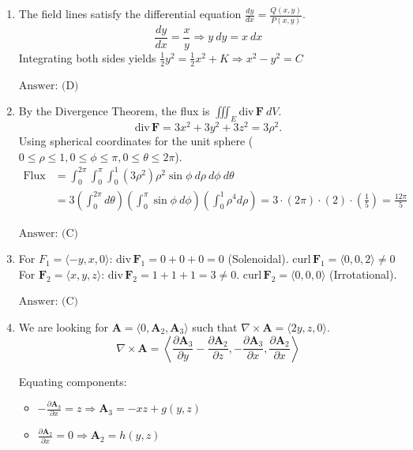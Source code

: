 \documentclass[a4paper, 12pt]{article}
\begin{document}
\begin{enumerate}[leftmargin=*,label=\textbf{\arabic*.}]
\begin{enumerate}[leftmargin=*, label=\textbf{\arabic{enumi}.\arabic*.}]
$\boxed{\text{Answer: (B)}}$

\item The field lines satisfy the differential equation $\frac{dy}{dx}=\frac{Q(x,y)}{P(x,y)}$.
\[
\frac{dy}{dx}=\frac{x}{y}\Rightarrow y~dy=x~dx
\]
Integrating both sides yields $\frac{1}{2}y^{2}=\frac{1}{2}x^{2}+K\Rightarrow x^{2}-y^{2}=C$

$\boxed{\text{Answer: (D)}}$

\item By the Divergence Theorem, the flux is $\iiint_{E}\text{div}\,\mathbf F~dV$.
\[\text{div}\,\mathbf F=3x^{2}+3y^{2}+3z^{2}=3\rho^{2}.\]
Using spherical coordinates for the unit sphere ($0\le\rho\le1,0\le\phi\le\pi,0\le\theta\le2\pi$).
\begin{align*}
\text{Flux}
&=\int_{0}^{2\pi}\int_{0}^{\pi}\int_{0}^{1}
(3\rho^{2})\rho^{2}\sin\phi~d\rho~d\phi~d\theta\\[1em]
&=3\left(\int_{0}^{2\pi}d\theta\right)
\left(\int_{0}^{\pi}\sin\phi~d\phi\right)
\left(\int_{0}^{1}\rho^{4}d\rho\right)
=3\cdot(2\pi)\cdot(2)\cdot\left(\frac{1}{5}\right)
=\frac{12\pi}{5}
\end{align*}

$\boxed{\text{Answer: (C)}}$

\item For $F_{1}=\langle-y,x,0\rangle$: $\text{div}\, \mathbf F_{1}=0+0+0=0$ (Solenoidal). $\text{curl}\,\mathbf F_{1}=\langle0,0,2\rangle\ne0$
For $\mathbf F_{2}=\langle x,y,z\rangle$: $\text{div}\,\mathbf F_{2}=1+1+1=3\ne0.$ $\text{curl}\,\mathbf F_{2}=\langle0,0,0\rangle$ (Irrotational).

$\boxed{\text{Answer: (C)}}$

\item We are looking for $\mathbf A=\langle0,\mathbf A_{2},\mathbf A_{3}\rangle$ such that $\nabla\times \mathbf A=\langle2y,z,0\rangle$.
\[
\nabla\times \mathbf A=\left\langle\frac{\partial \mathbf A_{3}}{\partial y}-\frac{\partial\mathbf A_{2}}{\partial z},-\frac{\partial \mathbf A_{3}}{\partial x},\frac{\partial \mathbf A_{2}}{\partial x}\right\rangle
\]

Equating components:

\begin{itemize}
    \item $\displaystyle-\frac{\partial\mathbf A_{3}}{\partial x}=z\Rightarrow \mathbf A_{3}=-xz+g(y,z)$
    
    \item $\displaystyle\frac{\partial\mathbf A_{2}}{\partial x}=0\Rightarrow \mathbf A_{2}=h(y,z)$
    

\end{itemize}
\end{enumerate}
\end{enumerate}
\end{document}
